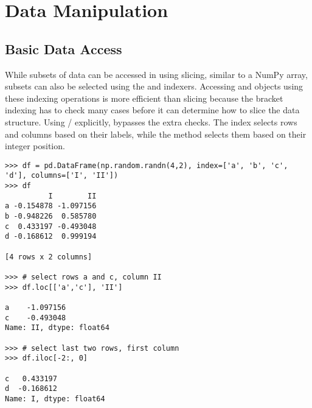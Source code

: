\begin{comment}
To save data, pandas has functions that write to several different
file formats.
A typical example is the \li{to_csv()} function method attached to
\li{Series} and \li{DataFrame} objects, which writes the data to a CSV file.
Keyword arguments allow you to specify the separator character, omit writing the
columns names or index, and specify many other options.
The code below
demonstrates its typical usage:
\begin{lstlisting}
>>> df.to_csv("my_df.csv")
\end{lstlisting}
\end{comment}



\section*{Data Manipulation}

\subsection*{Basic Data Access}

While subsets of data can be accessed in  using slicing, similar to a NumPy array, subsets can also be selected using the  and
 indexers.
Accessing  and  objects
using these indexing operations is more efficient than slicing because the bracket indexing has to check many cases before it can determine how to slice the data structure.
Using / explicitly, bypasses the extra checks.
The  index selects rows and columns based on
their labels, while the  method selects them based on their
integer position.


\begin{lstlisting}
>>> df = pd.DataFrame(np.random.randn(4,2), index=['a', 'b', 'c', 'd'], columns=['I', 'II'])
>>> df
          I        II
a -0.154878 -1.097156
b -0.948226  0.585780
c  0.433197 -0.493048
d -0.168612  0.999194

[4 rows x 2 columns]

>>> # select rows a and c, column II
>>> df.loc[['a','c'], 'II']

a    -1.097156
c    -0.493048
Name: II, dtype: float64

>>> # select last two rows, first column
>>> df.iloc[-2:, 0]

c   0.433197
d  -0.168612
Name: I, dtype: float64
\end{lstlisting}

